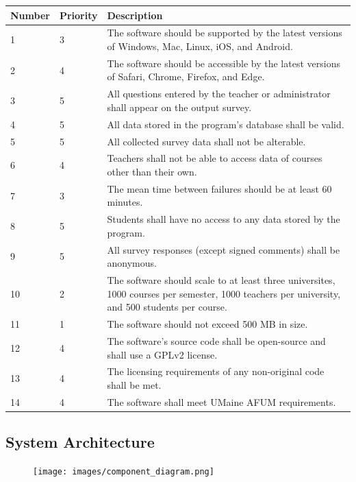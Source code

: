 \documentclass{article}
\begin{document}
\begin{center}
\begin{tabular}{|p{1.5cm}|p{1.5cm}|p{8cm}|}
\hline
\textbf{Number} & \textbf{Priority} & \textbf{Description} \\
\hline
1 & 3 & The software should be supported by the latest versions of Windows, Mac, Linux, iOS, and Android.\\ 
\hline
2 & 4 & The software should be accessible by the latest versions of Safari, Chrome, Firefox, and Edge.\\ 
\hline
3 & 5 & All questions entered by the teacher or administrator shall appear on the output survey.\\  
\hline
4 & 5 & All data stored in the program's database shall be valid.\\
\hline
5 & 5 & All collected survey data shall not be alterable.\\ 
\hline
6 & 4 & Teachers shall not be able to access data of courses other than their own.\\ 
\hline
7 & 3 & The mean time between failures should be at least 60 minutes.\\ 
\hline
8 & 5 & Students shall have no access to any data stored by the program.\\ 
\hline
9 & 5 & All survey responses (except signed comments) shall be anonymous.\\ 
\hline
10 & 2 & The software should scale to at least three universites, 1000 courses per semester, 1000 teachers per university, and 500 students per course.\\  
\hline
11 & 1 & The software should not exceed 500 MB in size.\\
\hline
12 & 4 & The software's source code shall be open-source and shall use a GPLv2 license.\\ 
\hline
13 & 4 & The licensing requirements of any non-original code shall be met.\\ 
\hline
14 & 4 & The software shall meet UMaine AFUM requirements.\\ 
\hline
\end{tabular}
\end{center}

\subsection{System Architecture}

\begin{center}
\begin{figure}[H]
\centering
\vspace{2mm}
{\texttt{[image: images/component\_diagram.png]}}
\end{figure}
\end{center}
\end{document}
